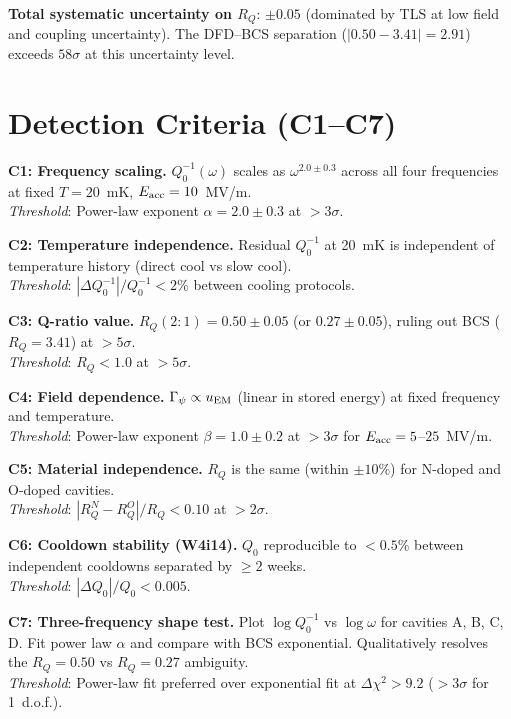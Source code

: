 \documentclass[11pt]{article}
\begin{document}
\textbf{Total systematic uncertainty on $R_Q$}: $\pm 0.05$ (dominated
by TLS at low field and coupling uncertainty). The DFD--BCS separation
($|0.50 - 3.41| = 2.91$) exceeds $58\sigma$ at this uncertainty level.


\section{Detection Criteria (C1--C7)}

\begin{tcolorbox}[colback=green!3!white, colframe=actioncolor,
  title=\textbf{DETECTION CRITERIA --- Exact Numerical Thresholds}]

\textbf{C1: Frequency scaling.} $Q_0^{-1}(\omega)$ scales as
$\omega^{2.0 \pm 0.3}$ across all four frequencies at fixed $T = 20$~mK,
$E_{\rm acc} = 10$~MV/m. \\
\textit{Threshold}: Power-law exponent $\alpha = 2.0 \pm 0.3$ at
$> 3\sigma$.

\textbf{C2: Temperature independence.} Residual $Q_0^{-1}$ at 20~mK
is independent of temperature history (direct cool vs slow cool).\\
\textit{Threshold}: $|\Delta Q_0^{-1}|/Q_0^{-1} < 2\%$ between
cooling protocols.

\textbf{C3: Q-ratio value.} $R_Q(2:1) = 0.50 \pm 0.05$ (or
$0.27 \pm 0.05$), ruling out BCS ($R_Q = 3.41$) at $> 5\sigma$.\\
\textit{Threshold}: $R_Q < 1.0$ at $> 5\sigma$.

\textbf{C4: Field dependence.} $\Gamma_\psi \propto u_{\rm EM}$
(linear in stored energy) at fixed frequency and temperature.\\
\textit{Threshold}: Power-law exponent $\beta = 1.0 \pm 0.2$ at
$> 3\sigma$ for $E_{\rm acc} = 5$--$25$~MV/m.

\textbf{C5: Material independence.} $R_Q$ is the same (within
$\pm 10\%$) for N-doped and O-doped cavities.\\
\textit{Threshold}: $|R_Q^N - R_Q^O|/R_Q < 0.10$ at $> 2\sigma$.

\textbf{C6: Cooldown stability (W4i14).} $Q_0$ reproducible to
$< 0.5\%$ between independent cooldowns separated by $\geq 2$ weeks.\\
\textit{Threshold}: $|\Delta Q_0|/Q_0 < 0.005$.

\textbf{C7: Three-frequency shape test.} Plot $\log Q_0^{-1}$ vs
$\log \omega$ for cavities A, B, C, D. Fit power law $\alpha$ and
compare with BCS exponential. Qualitatively resolves the $R_Q = 0.50$
vs $R_Q = 0.27$ ambiguity.\\
\textit{Threshold}: Power-law fit preferred over exponential fit at
$\Delta\chi^2 > 9.2$ ($> 3\sigma$ for 1~d.o.f.).

\end{tcolorbox}
\end{document}
